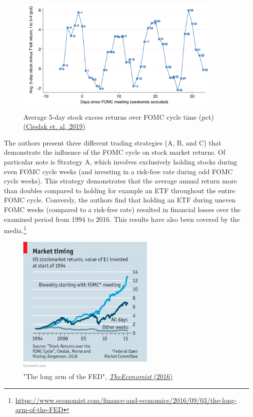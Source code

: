 \begin{figure}[h]
    \centering
    \label{cies19_fig1}
    \includegraphics[width=0.9\textwidth]{figures/cies19/fig1}
    \caption{Average 5-day stock excess returns over FOMC cycle time (pct) \hyperref[item:cieslak_stock_2019]{(Cieslak et. al, 2019)} }
\end{figure}

The authors present three different trading strategies (A, B, and C) that demonstrate the influence of the FOMC cycle on stock market returns.  Of particular note is Strategy A, which involves exclusively holding stocks during even FOMC cycle weeks (and investing in a risk-free rate during odd FOMC cycle weeks). This strategy demonstrates that the average annual return more than doubles compared to holding for example an ETF throughout the entire FOMC cycle.  Conversly, the authors find that holding an ETF during uneven FOMC weeks (compared to a risk-free rate) resulted in financial losses over the examined period from 1994 to 2016.  This results have also been covered by the media.\footnote{\url{https://www.economist.com/finance-and-economics/2016/09/03/the-long-arm-of-the-FED}}

\begin{figure}[h]
    \centering
     \label{FED_long_arm}
    \includegraphics[width=0.6\textwidth]{figures/20160903_FNC453.png}
    \caption{"The long arm of the FED", \hyperref[item:noauthor_long_2016]{\textit{TheEconomist} (2016)}}
\end{figure}

